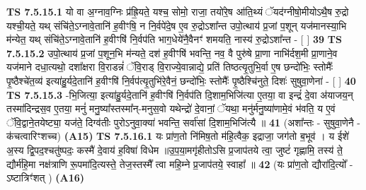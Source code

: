 \documentclass[17pt]{extarticle}
\begin{document}
                                        \textbf{ TS 7.5.15.1} \newline
                  यो वा अ॒ग्नाव॒ग्निः प्र॑ह्रि॒यते॒ यश्च॒ सोमो॒ राजा॒ तयो॑रे॒ष आ॑ति॒थ्यं ॅयद॑ग्नीषो॒मीयोऽथै॒ष रु॒द्रो यश्ची॒यते॒ यथ् संचि॑ते॒ऽग्नावे॒तानि॑ ह॒वीꣳषि॒ न नि॒र्वपे॑दे॒ष ए॒व रु॒द्रोऽशा᳚न्त उपो॒त्थाय॑ प्र॒जां प॒शून् यज॑मानस्या॒भि म॑न्येत॒ यथ् संचि॑ते॒ऽग्नावे॒तानि॑ ह॒वीꣳषि॑ नि॒र्वप॑ति भाग॒धेये॑नै॒वैनꣳ॑ शमयति॒ नास्य॑ रु॒द्रोऽशा᳚न्त - [  ] \textbf{  39} \newline
                  \newline
                                \textbf{ TS 7.5.15.2} \newline
                  उपो॒त्थाय॑ प्र॒जां प॒शून॒भि म॑न्यते॒ दश॑ ह॒वीꣳषि॑ भवन्ति॒ नव॒ वै पुरु॑षे प्रा॒णा नाभि॑र्दश॒मी प्रा॒णाने॒व यज॑माने दधा॒त्यथो॒ दशा᳚क्षरा वि॒राडन्नं॑ ॅवि॒राड् वि॒राज्ये॒वान्नाद्ये॒ प्रति॑ तिष्ठत्यृ॒तुभि॒र्वा ए॒ष छन्दो॑भिः॒ स्तोमैः᳚ पृ॒ष्ठैश्चे॑त॒व्य॑ इत्या॑हु॒र्यदे॒तानि॑ ह॒वीꣳषि॑ नि॒र्वप॑त्यृ॒तुभि॑रे॒वैनं॒ छन्दो॑भिः॒ स्तोमैः᳚ पृ॒ष्ठैश्चि॑नुते॒ दिशः॑ सुषुवा॒णेना॑ - [  ] \textbf{  40} \newline
                  \newline
                                \textbf{ TS 7.5.15.3} \newline
                  -भि॒जित्या॒ इत्या॑हु॒र्यदे॒तानि॑ ह॒वीꣳषि॑ नि॒र्वप॑ति दि॒शाम॒भिजि॑त्या ए॒तया॒ वा इन्द्रं॑ दे॒वा अ॑याजय॒न् तस्मा॑दिन्द्रस॒व ए॒तया॒ मनुं॑ मनु॒ष्या᳚स्तस्मा᳚न्-मनुस॒वो यथेन्द्रो॑ दे॒वानां॒ ॅयथा॒ मनु॑र्मनु॒ष्या॑णामे॒वं भ॑वति॒ य ए॒वं ॅवि॒द्वाने॒तयेष्ट्या॒ यज॑ते॒ दिग्व॑तीः पुरोऽनुवा॒क्या॑ भवन्ति॒ सर्वा॑सां दि॒शाम॒भिजि॑त्यै ॥ \textbf{  41} \newline
                  \newline
                      (अशा᳚न्तः - सुषुवा॒णेनै - क॑चत्वारिꣳशच्च)  \textbf{(A15)} \newline \newline
                                        \textbf{ TS 7.5.16.1} \newline
                  यः प्रा॑ण॒तो नि॑मिष॒तो म॑हि॒त्वैक॒ इद्राजा॒ जग॑तो ब॒भूव॑ । य ईशे॑ अ॒स्य द्वि॒पद॒श्चतु॑ष्पदः॒ कस्मै॑ दे॒वाय॑ ह॒विषा॑ विधेम ॥उ॒प॒या॒मगृ॑हीतोऽसि प्र॒जाप॑तये त्वा॒ जुष्टं॑ गृह्णामि॒ तस्य॑ ते॒ द्यौर्म॑हि॒मा नक्ष॑त्राणि रू॒पमा॑दि॒त्यस्ते॒ तेज॒स्तस्मै᳚ त्वा महि॒म्ने प्र॒जाप॑तये॒ स्वाहा᳚ ॥ \textbf{  42} \newline
                  \newline
                      (यः प्रा॑ण॒तो द्यौरा॑दि॒त्यो᳚ - ऽष्टात्रिꣳ॑शत् )  \textbf{(A16)} \newline \newline
\end{document}
